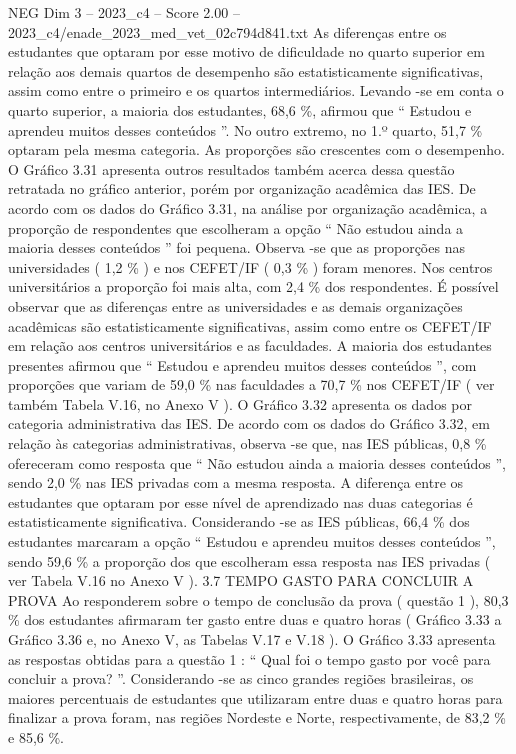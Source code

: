 \begin{textsample}{NEG Dim 3 – 2023\_c4 – Score 2.00 – 2023\_c4/enade\_2023\_med\_vet\_02c794d841.txt}
As diferenças entre os estudantes que optaram por esse motivo de dificuldade no quarto superior em relação aos demais quartos de desempenho são estatisticamente significativas, assim como entre o primeiro e os quartos intermediários.
Levando -se em conta o quarto superior, a maioria dos estudantes, 68,6 \%, afirmou que “ Estudou e aprendeu muitos desses conteúdos ”.
No outro extremo, no 1.º quarto, 51,7 \% optaram pela mesma categoria.
As proporções são crescentes com o desempenho.
O Gráfico 3.31 apresenta outros resultados também acerca dessa questão retratada no gráfico anterior, porém por organização acadêmica das IES.
De acordo com os dados do Gráfico 3.31, na análise por organização acadêmica, a proporção de respondentes que escolheram a opção “ Não estudou ainda a maioria desses conteúdos ” foi pequena.
Observa -se que as proporções nas universidades ( 1,2 \% ) e nos CEFET/IF ( 0,3 \% ) foram menores.
Nos centros universitários a proporção foi mais alta, com 2,4 \% dos respondentes.
É possível observar que as diferenças entre as universidades e as demais organizações acadêmicas são estatisticamente significativas, assim como entre os CEFET/IF em relação aos centros universitários e as faculdades.
A maioria dos estudantes presentes afirmou que “ Estudou e aprendeu muitos desses conteúdos ”, com proporções que variam de 59,0 \% nas faculdades a 70,7 \% nos CEFET/IF ( ver também Tabela V.16, no Anexo V ).
O Gráfico 3.32 apresenta os dados por categoria administrativa das IES.
De acordo com os dados do Gráfico 3.32, em relação às categorias administrativas, observa -se que, nas IES públicas, 0,8 \% ofereceram como resposta que “ Não estudou ainda a maioria desses conteúdos ”, sendo 2,0 \% nas IES privadas com a mesma resposta.
A diferença entre os estudantes que optaram por esse nível de aprendizado nas duas categorias é estatisticamente significativa.
Considerando -se as IES públicas, 66,4 \% dos estudantes marcaram a opção “ Estudou e aprendeu muitos desses conteúdos ”, sendo 59,6 \% a proporção dos que escolheram essa resposta nas IES privadas ( ver Tabela V.16 no Anexo V ). 3.7 TEMPO GASTO PARA CONCLUIR A PROVA Ao responderem sobre o tempo de conclusão da prova ( questão 1 ), 80,3 \% dos estudantes afirmaram ter gasto entre duas e quatro horas ( Gráfico 3.33 a Gráfico 3.36 e, no Anexo V, as Tabelas V.17 e V.18 ).
O Gráfico 3.33 apresenta as respostas obtidas para a questão 1 : “ Qual foi o tempo gasto por você para concluir a prova? ”.
Considerando -se as cinco grandes regiões brasileiras, os maiores percentuais de estudantes que utilizaram entre duas e quatro horas para finalizar a prova foram, nas regiões Nordeste e Norte, respectivamente, de 83,2 \% e 85,6 \%.

\end{textsample}
